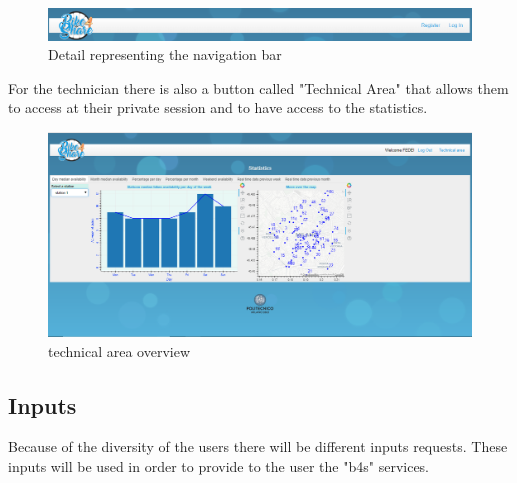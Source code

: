 \documentclass{article}
\begin{document}
\begin{figure}[H]
    \centering
    \includegraphics[width=1\linewidth]{image/bar.PNG}
    \caption{Detail representing the navigation bar}
    \label{fig:navbar}
\end{figure}
For the technician there is also a button called "Technical Area" that allows them to access at their private session and to have access to the statistics. 

\begin{figure}[H]
    \centering
    \includegraphics[width=0.8\linewidth]{image/tech.PNG}
    \caption{technical area overview}
    \label{fig:usageb4s_stat}
\end{figure}

\subsection{Inputs}
Because of the diversity of the users there will be different inputs requests. These inputs will be used in order to provide to the user the "b4s" services.
\end{document}
